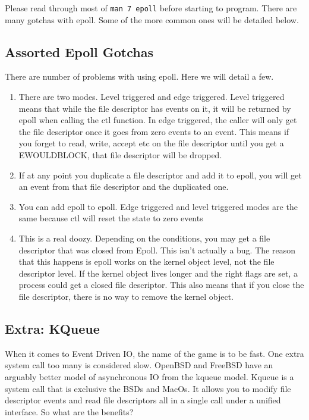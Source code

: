 Please read through most of \texttt{man 7 epoll} before starting to program. There are many gotchas with epoll. Some of the more common ones will be detailed below.

\subsection{Assorted Epoll Gotchas}

There are number of problems with using epoll. Here we will detail a few.

\begin{enumerate}
\item There are two modes. Level triggered and edge triggered. Level triggered means that while the file descriptor has events on it, it will be returned by epoll when calling the ctl function. In edge triggered, the caller will only get the file descriptor once it goes from zero events to an event.
  This means if you forget to read, write, accept etc on the file descriptor until you get a EWOULDBLOCK, that file descriptor will be dropped.
\item If at any point you duplicate a file descriptor and add it to epoll, you will get an event from that file descriptor and the duplicated one.
\item You can add epoll to epoll. Edge triggered and level triggered modes are the same because ctl will reset the state to zero events
\item This is a real doozy. Depending on the conditions, you may get a file descriptor that was closed from Epoll. This isn't actually a bug. The reason that this happens is epoll works on the kernel object level, not the file descriptor level.
  If the kernel object lives longer and the right flags are set, a process could get a closed file descriptor.
  This also means that if you close the file descriptor, there is no way to remove the kernel object.
\end{enumerate}


\subsection{Extra: KQueue}

When it comes to Event Driven IO, the name of the game is to be fast.
One extra system call too many is considered slow.
OpenBSD and FreeBSD have an arguably better model of asynchronous IO from the kqueue model.
Kqueue is a system call that is exclusive the BSDs and MacOs.
It allows you to modify file descriptor events and read file descriptors all in a single call under a unified interface.
So what are the benefits?


